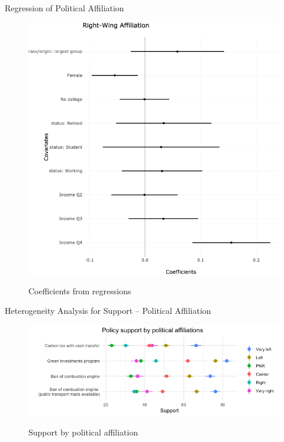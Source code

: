 \documentclass[aspectratio=169,9pt,dvipsnames]{beamer}
\begin{document}
\begin{frame}{Regression of Political Affiliation}%
\vspace{-.5cm}
\begin{figure}[h!]
\caption{Coefficients from regressions}
\includegraphics[width=.5\textwidth]{../figures/DK/coef_Right_DK.png} \\
\end{figure}
\end{frame}

\begin{frame}{Heterogeneity Analysis for Support -- Political Affiliation}%
\vspace{-.5cm}
\begin{figure}[h!]
\caption{Support by political affiliation}
\includegraphics[width=.7\textwidth]{../figures/DK/support_by_political_DK.png} \\
\end{figure}
\end{frame}
\end{document}
